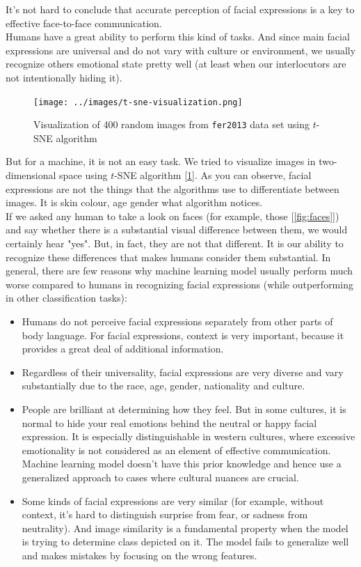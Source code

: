 It's not hard to conclude that accurate perception of facial expressions is a key to effective face-to-face communication.\\

Humans have a great ability to perform this kind of tasks. And since main facial expressions are universal and do not vary with culture or environment, we usually recognize others emotional state pretty well (at least when our interlocutors are not intentionally hiding it).\\

\begin{figure}
	\centering
	\texttt{[image: ../images/t-sne-visualization.png]}
	\caption{Visualization of 400 random images from \texttt{fer2013} data set using $t$-SNE algorithm}
	\label{fig:tsne}
\end{figure}


But for a machine, it is not an easy task. We tried to visualize images in two-dimensional space using $t$-SNE algorithm [\ref{fig:tsne}]. As you can observe, facial expressions are not the things that the algorithms use to differentiate between images. It is skin colour, age gender what algorithm notices.\\

If we asked any human to take a look on faces (for example, those [\ref{fig:faces}]) and say whether there is a substantial visual difference between them, we would certainly hear "yes". But, in fact, they are not that different. It is our ability to recognize these differences that makes humans consider them substantial. In general, there are few reasons why machine learning model usually perform much worse compared to humans in recognizing facial expressions (while outperforming in other classification tasks):

\begin{itemize}
    \item 
    Humans do not perceive facial expressions separately from other parts of body language. For facial expressions, context is very important, because it provides a great deal of additional information.
    \item
    Regardless of their universality, facial expressions are very diverse and vary substantially due to the race, age, gender, nationality and culture.
    \item 
    People are brilliant at determining how they feel. But in some cultures, it is normal to hide your real emotions behind the neutral or happy facial expression. It is especially distinguishable in western cultures, where excessive emotionality is not considered as an element of effective communication. Machine learning model doesn't have this prior knowledge and hence use a generalized approach to cases where cultural nuances are crucial.
    \item 
    Some kinds of facial expressions are very similar (for example, without context, it's hard to distinguish surprise from fear, or sadness from neutrality). And image similarity is a fundamental property when the model is trying to determine class depicted on it. The model fails to generalize well and makes mistakes by focusing on the wrong features.
\end{itemize}



